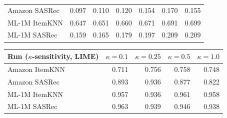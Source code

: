 \begin{table}[!htbp]
\begin{tabular}{@{}lrrrrrr@{}}
Amazon SASRec & 0.097 & 0.110 & 0.120 & 0.154 & 0.170 & 0.155 \\
ML-1M ItemKNN & 0.647 & 0.651 & 0.660 & 0.671 & 0.691 & 0.699 \\
ML-1M SASRec & 0.159 & 0.165 & 0.179 & 0.197 & 0.209 & 0.209 \\
\bottomrule
\end{tabular}
\par\vspace{2mm}
\begin{tabular}{@{}lrrrr@{}}
\toprule
Run ($\kappa$-sensitivity, LIME) & $\kappa=0.1$ & $\kappa=0.25$ & $\kappa=0.5$ & $\kappa=1.0$ \\
\midrule
Amazon ItemKNN & 0.711 & 0.756 & 0.758 & 0.748 \\
Amazon SASRec & 0.893 & 0.936 & 0.877 & 0.822 \\
ML-1M ItemKNN & 0.957 & 0.936 & 0.961 & 0.958 \\
ML-1M SASRec & 0.963 & 0.939 & 0.946 & 0.938 \\
\bottomrule
\end{tabular}
\end{table}